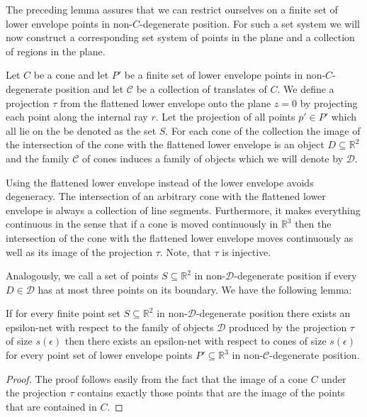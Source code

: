 \documentclass{stacs_proc}
\newcommand{\setR}{\mathbb{R}}
\newcommand{\D}{\mathcal{D}}
\newcommand{\C}{\mathcal{C}}
\begin{document}
The preceding lemma assures that we can restrict ourselves on a finite
set of lower envelope points in non-$C$-degenerate position. For such
a set system we will now construct a corresponding set system of
points in the plane and a collection of regions in the plane. 


\begin{defi}
  Let $C$ be a cone and let $P'$ be a finite set of lower envelope
  points in non-$C$-degenerate position and let $\C$ be a collection
  of translates of $C$. We define a projection $\tau$ from the flattened
  lower envelope onto the plane $z=0$ by projecting each point along
  the internal ray $r$. Let the projection of all points $p'\in P'$
  which all lie on the be denoted as the set $S$. For each cone of the
  collection the image of the intersection of the cone with the
  flattened lower envelope is an object $D\subseteq \setR^2$ and the family $\C$
  of cones induces a family of objects which we will denote by $\D$. 
\end{defi}
Using the flattened lower envelope instead of the lower
envelope avoids degeneracy. The intersection of an arbitrary cone with
the flattened lower envelope is always a collection of line
segments. Furthermore, it makes everything continuous in the
sense that if a cone is moved continuously in $\setR^3$ then the
intersection of the cone with the flattened lower envelope moves
continuously as well as its image of the projection $\tau$. Note, that
$\tau$ is injective.  

Analogously, we call a set of points $S\subseteq \setR^2$ in non-$\D$-degenerate
position if every $D\in \D$ has at most three points on its boundary. 
We have the following lemma:
\begin{lemma}
  \label{lem:2}
  If for every finite point set $S\subseteq\setR^2$ in non-$\D$-degenerate
  position there exists 
  an epsilon-net with respect to the family of objects $\D$
  produced by the projection $\tau$ of size $s(\epsilon)$ then there exists 
  an epsilon-net with respect to cones of size $s(\epsilon)$ for every point
  set  of lower envelope points $P'\subseteq\setR^3$ in non-$\C$-degenerate position.
\end{lemma}
\begin{proof}
  The proof follows easily from the fact that the image of a cone $C$
  under the projection $\tau$ contains exactly those points that are the
  image of the points that are contained in $C$. 
\end{proof}
\end{document}
